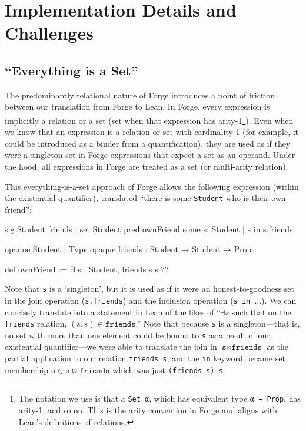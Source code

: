 \section{Implementation Details and Challenges}\label{sec:implementation}

\subsection{``Everything is a Set''}\label{sec:everything-is-a-set}
The predominantly relational nature of Forge introduces a point of friction between our translation from Forge to Lean. In Forge, every expression is implicitly a relation or a set (set when that expression has arity-1\footnote{The notation we use is that a \texttt{Set α}, which has equivalent type \texttt{α → Prop}, has arity-1, and so on. This is the arity convention in Forge and aligns with Lean's definitions of relations.}). Even when we know that an expression is a relation or set with cardinality 1 (for example, it could be introduced as a binder from a quantification), they are used as if they were a singleton set in Forge expressions that expect a set as an operand. Under the hood, all expressions in Forge are treated as a set (or multi-arity relation). 

This everything-is-a-set approach of Forge allows the following expression (within the existential quantifier), translated ``there is some \texttt{Student} who is their own friend'': 

\vspace{0.5em}
\noindent\begin{minipage}{0.5\textwidth}
\begin{forge*}
sig Student {
  friends : set Student
}
pred ownFriend {
  some s: Student |
    s in s.friends
}
\end{forge*}
\end{minipage}%
\begin{minipage}{0.5\textwidth}
\begin{lean*}
opaque Student : Type
opaque friends : Student → Student → Prop

def ownFriend := 
  ∃ s : Student, 
    friends s s
?\phantom{}?
\end{lean*}
\end{minipage}
\vspace{0.5em}\newline
Note that \texttt{s} is a `singleton', but it is used as if it were an honest-to-goodness set in the join operation (\texttt{s.friends}) and the inclusion operation (\texttt{s in }...). We can concisely translate into a statement in Lean of the likes of ``$\exists s$ such that on the \texttt{friends} relation, $(s,s)\in \texttt{friends}$.'' Note that because \texttt{s} is a singleton---that is, no set with more than one element could be bound to \texttt{s} as a result of our existential quantifier---we were able to translate the join in $\texttt{s} \bowtie \texttt{friends}$ as the partial application to our relation \texttt{friends s}, and the \texttt{in} keyword became set membership $\texttt{s}\in \texttt{s} \bowtie \texttt{friends}$ which was just \texttt{(friends s) s}. 


